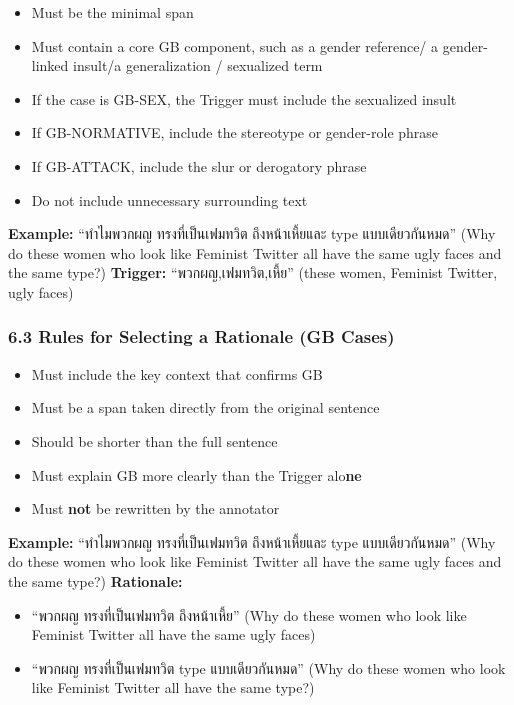 \documentclass[12pt,oneside,openright,a4paper]{cpe-english-project}
\begin{document}
\begin{itemize}
\setlength{\itemsep}{0.15\baselineskip}
\setlength{\parsep}{0pt}
\setlength{\parskip}{0pt}
\item
  Must be the minimal span
\item
  Must contain a core GB component, such as a gender reference/ a
  gender-linked insult/a generalization / sexualized term
\item
  If the case is GB-SEX, the Trigger must include the sexualized
  insult
\item
  If GB-NORMATIVE, include the stereotype or gender-role phrase
\item
  If GB-ATTACK, include the slur or derogatory phrase
\item
  Do not include unnecessary surrounding text
\end{itemize}

\textbf{Example:} ``ทำไมพวกผญ ทรงที่เป็นเฟมทวิต ถึงหน้าเหี้ยและ type
แบบเดียวกันหมด''
(Why do these women who look like Feminist Twitter all have the same
ugly faces and the same type?)
\textbf{Trigger:} ``พวกผญ,เฟมทวิต,เหี้ย'' (these women, Feminist Twitter,
ugly faces)

\subsubsection{6.3 Rules for Selecting a Rationale (GB Cases)}\label{rules-for-selecting-a-rationale-gb-cases}

\begin{itemize}
\setlength{\itemsep}{0.15\baselineskip}
\setlength{\parsep}{0pt}
\setlength{\parskip}{0pt}
\item
  Must include the key context that confirms GB
\item
  Must be a span taken directly from the original sentence
\item
  Should be shorter than the full sentence
\item
  Must explain GB more clearly than the Trigger alo\textbf{ne}
\item
  Must \textbf{not} be rewritten by the annotator
\end{itemize}

\textbf{Example:} ``ทำไมพวกผญ ทรงที่เป็นเฟมทวิต ถึงหน้าเหี้ยและ type
แบบเดียวกันหมด''
(Why do these women who look like Feminist Twitter all have the same
ugly faces and the same type?)
\textbf{Rationale:}

\begin{itemize}
\setlength{\itemsep}{0.15\baselineskip}
\setlength{\parsep}{0pt}
\setlength{\parskip}{0pt}
\item
  ``พวกผญ ทรงที่เป็นเฟมทวิต ถึงหน้าเหี้ย'' (Why do these women who look like
  Feminist Twitter all have the same ugly faces)
\item
  ``พวกผญ ทรงที่เป็นเฟมทวิต type แบบเดียวกันหมด'' (Why do these women who look
  like Feminist Twitter all have the same type?)
\end{itemize}
\end{document}
